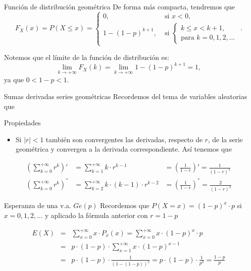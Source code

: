 \documentclass[
  ignorenonframetext,
  aspectratio=169]{beamer}
\providecommand{\tightlist}{%
  \setlength{\itemsep}{0pt}\setlength{\parskip}{0pt}}\usepackage{longtable,booktabs,array}
\begin{document}
\begin{frame}{Función de distribución geométrica}
\protect\hypertarget{funciuxf3n-de-distribuciuxf3n-geomuxe9trica-3}{}
De forma más compacta, tendremos que \[
F_X(x)=P(X\leq x)=
\left\{\begin{array}{ll} 
0, & \mbox{ si } x<0,\\
1- (1-p)^{k+1}, & \mbox{ si } \left\{ \begin{array}{l}k\leq x< k+1,\\\mbox{para } k=0,1,2,\ldots\end{array}
\right.
\end{array}
\right..
\]

Notemos que el límite de la función de distribución es: \[
\displaystyle\lim_{k\to +\infty } F_X(k)=\lim_{k\to +\infty } 1-(1-p)^{k+1}=
1,
\] ya que \(0<1-p<1\).
\end{frame}

\begin{frame}{Sumas derivadas series geométricas}
\protect\hypertarget{sumas-derivadas-series-geomuxe9tricas}{}
Recordemos del tema de variables aleatorias que

Propiedades

\begin{itemize}
\tightlist
\item
  Si \(|r|<1\) también son convergentes las derivadas, respecto de
  \(r\), de la serie geométrica y convergen a la derivada
  correspondiente. Así tenemos que
\end{itemize}

\[
\begin{array}{rlrl}
\left(\sum_{k=0}^{+\infty} r^k\right)'&= \sum_{k=1}^{+\infty}k\cdot
r^{k-1} &= \left(\frac1{1-r}\right)'=\frac1{(1-r)^2}\\
\left(\sum_{k=0}^{+\infty} r^k\right)^{''}&= \sum_{k=2}^{+\infty}k \cdot(k-1)\cdot
r^{k-2}&=\left(\frac1{1-r}\right)^{''}=\frac2{(1-r)^3}
\end{array}
\]
\end{frame}

\begin{frame}{Esperanza de una v.a. \(Ge(p)\)}
\protect\hypertarget{esperanza-de-una-v.a.-gep}{}
Recordemos que \(P(X=x)=(1-p)^x\cdot p\) si \(x=0,1,2,\ldots\) y
aplicado la fórmula anterior con \(r=1-p\)

\begin{eqnarray*}
E(X)&=&\sum_{x=0}^{+\infty} x\cdot P_x(x)=\sum_{x=0}^{+\infty} x\cdot (1-p)^x\cdot p\\
&=& p\cdot (1-p) \cdot \sum_{x=1}^{+\infty} x\cdot (1-p)^{x-1}\\
&=& p\cdot (1-p)\cdot \frac{1}{(1-(1-p))^2}=p\cdot (1-p)\cdot \frac{1}{p^2}=\frac{1-p}{p}
\end{eqnarray*}
\end{frame}
\end{document}

